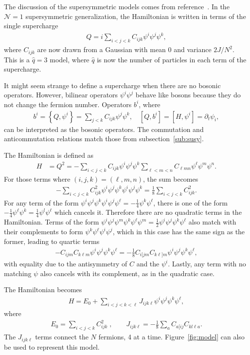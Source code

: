 \documentclass[12pt]{article} %
\renewcommand{\cal}{\mathcal}
\renewcommand{\th}[1]{\frac{1}{#1}}
\renewcommand{\l}{\ell}
\newcommand{\comm}[2]{\left[#1,#2\right]}
\newcommand{\acom}[2]{\left\{#1,#2\right\}}
\begin{document}
The discussion of the supersymmetric models comes from reference~\cite{fu16}. In the $\cal N=1$ supersymmetric generalization, the Hamiltonian is written in terms of the single supercharge
\begin{align}
Q = i\sum_{i<j<k}C_{ijk}\psi^i\psi^j\psi^k,
\end{align}
where $C_{ijk}$ are now drawn from a Gaussian with mean 0 and variance $2J/N^2$. This is a $\hat{q} = 3$ model, where $\hat{q}$ is now the number of particles in each term of the supercharge. 

It might seem strange to define a supercharge when there are no bosonic operators. However, bilinear operators $\psi^i\psi^j$ behave like bosons because they do not change the fermion number. Operators $b^i$, where
\begin{align}
b^i = \acom{Q}{\psi^i} = \sum_{j<k}C_{ijk}\psi^j\psi^k, \quad \comm{Q}{b^i} 
	= \comm{H}{\psi^i} = \partial_t\psi_i, \label{eqn:N1bosons}
\end{align}
can be interpreted as the bosonic operators. The commutation and anticommutation relations match those from subsection~\ref{sub:susy}.

The Hamiltonian is defined as
\begin{align}
H &= Q^2 = - \sum_{i<j<k}C_{ijk}\psi^i\psi^j\psi^k\sum_{\l<m<n}C_{\l mn}\psi^\l
	\psi^m\psi^n.
\end{align}
For those terms where $(i,j,k) = (\l,m,n)$, the sum becomes
\begin{align}
-\sum_{i<j<k} C_{ijk}^2 \psi^i\psi^j\psi^k \psi^i\psi^j\psi^k = \th{8} 
	\sum_{i<j<k}C_{ijk}^2.
\end{align}
For any term of the form $\psi^i\psi^j\psi^k\psi^i\psi^j\psi^\l = -\th{4}\psi^k\psi^\l$, there is one of the form $-\th{4}\psi^\l\psi^k=\th{4}\psi^l\psi^\l$ which cancels it. Therefore there are no quadratic terms in the Hamiltonian. Terms of the form $\psi^i\psi^j\psi^m\psi^k\psi^\l\psi^m = \th{2}\psi^i\psi^j\psi^k\psi^\l$ also match with their complements to form $\psi^k\psi^\l\psi^i\psi^j$, which in this case has the same sign as the former, leading to quartic terms
\begin{align}
-C_{ijm}C_{k\l m}\psi^i\psi^j\psi^k\psi^\l = -\th{8}C_{i[jm}C_{k\l]m} \psi^i \psi^j \psi^k\psi^\l,
\end{align}
with equality due to the antisymmetry of $C$ and the $\psi^i$. Lastly, any term with no matching $\psi$ also cancels with its complement, as in the quadratic case.

The Hamiltonian becomes
\begin{align}
H = E_0 + \sum_{i<j<k<\l}J_{ijk\l}\psi^i\psi^j\psi^k\psi^\l, \label{eqn:N1def}
\end{align}
where
\begin{align}
E_0 = \sum_{i<j<k} C_{ijk}^2\;,\qquad J_{ijk\l} = -\th{8}\sum_{a} C_{a[ij}
	C_{kl\l a}.
\end{align}
The $J_{ijk\l}$ terms connect the $N$ fermions, 4 at a time. Figure~\ref{fig:model} can also be used to represent this model.
\end{document}
